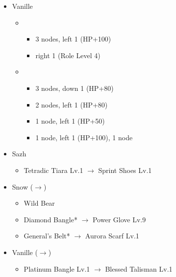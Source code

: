 \begin{menu}
\begin{itemize}
\begin{itemize}
\begin{itemize}
				\end{itemize}
			\item Vanille
				\begin{itemize}
					\item \sab
						\begin{itemize}
							\item 3 nodes, left 1 (HP+100)
							\item right 1 (Role Level 4)
						\end{itemize}
					\item \med
						\begin{itemize}
							\item 3 nodes, down 1 (HP+80)
							\item 2 nodes, left 1 (HP+80)
							\item 1 node, left 1 (HP+50)
							\item 1 node, left 1 (HP+100), 1 node
						\end{itemize}
				\end{itemize}
		\end{itemize}
	\equip
		\begin{itemize}
			\item Sazh
				\begin{itemize}
					\item Tetradic Tiara Lv.1 $\rightarrow$ Sprint Shoes Lv.1
				\end{itemize}			
			\item Snow ($\rightarrow$)
				\begin{itemize}
					\item Wild Bear
					\item Diamond Bangle* $\rightarrow$ Power Glove Lv.9
					\item General's Belt* $\rightarrow$ Aurora Scarf Lv.1
				\end{itemize}
			\item Vanille ($\rightarrow$)
				\begin{itemize}
					\item Platinum Bangle Lv.1 $\rightarrow$ Blessed Talisman Lv.1
				\end{itemize}				
		\end{itemize}
	\end{itemize}
\end{menu}

\renewcommand{\first}{[1] Tireless Charge (\com/\com/\med)}
\renewcommand{\second}{[2] Devastation (\com/\com/\sab)}
\renewcommand{\third}{[3] Premeditation (\syn/\sen/\sab)}
\renewcommand{\fourth}{[4] Tri-Disaster (\rav/\rav/\rav)}
\renewcommand{\fifth}{[5] Dirty Fighting (\com/\sen/\sab)}
\renewcommand{\sixth}{[6] Mystic Tower (\rav/\sen/\rav)}

